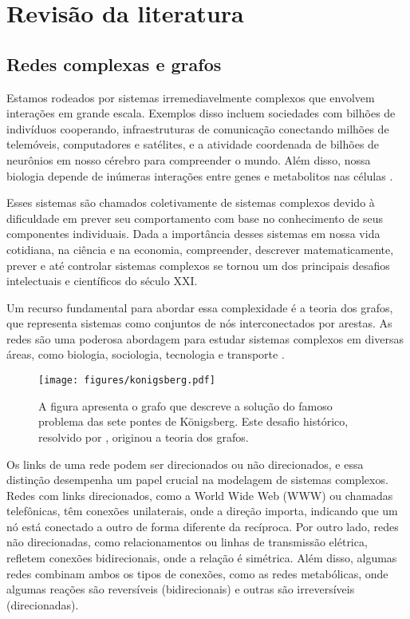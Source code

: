 \chapter{Revisão da literatura}

\section{Redes complexas e grafos}

Estamos rodeados por sistemas irremediavelmente complexos que envolvem interações em grande escala. Exemplos disso incluem sociedades com bilhões de indivíduos cooperando, infraestruturas de comunicação conectando milhões de telemóveis, computadores e satélites, e a atividade coordenada de bilhões de neurônios em nosso cérebro para compreender o mundo. Além disso, nossa biologia depende de inúmeras interações entre genes e metabolitos nas células \cite{Albert_2002}.

Esses sistemas são chamados coletivamente de sistemas complexos devido à dificuldade em prever seu comportamento com base no conhecimento de seus componentes individuais. Dada a importância desses sistemas em nossa vida cotidiana, na ciência e na economia, compreender, descrever matematicamente, prever e até controlar sistemas complexos se tornou um dos principais desafios intelectuais e científicos do século XXI.

Um recurso fundamental para abordar essa complexidade é a teoria dos grafos, que representa sistemas como conjuntos de nós interconectados por arestas. As redes são uma poderosa abordagem para estudar sistemas complexos em diversas áreas, como biologia, sociologia, tecnologia e transporte \cite{barabasi2016network}.

\begin{figure}[!h]
    \centering
    \texttt{[image: figures/konigsberg.pdf]}
    \caption{A figura apresenta o grafo que descreve a solução do famoso problema das sete pontes de Königsberg. Este desafio histórico, resolvido por , originou a teoria dos grafos.}
    \label{fig:basin-region}
\end{figure}

Os links de uma rede podem ser direcionados ou não direcionados, e essa distinção desempenha um papel crucial na modelagem de sistemas complexos. Redes com links direcionados, como a World Wide Web (WWW) ou chamadas telefônicas, têm conexões unilaterais, onde a direção importa, indicando que um nó está conectado a outro de forma diferente da recíproca. Por outro lado, redes não direcionadas, como relacionamentos ou linhas de transmissão elétrica, refletem conexões bidirecionais, onde a relação é simétrica. Além disso, algumas redes combinam ambos os tipos de conexões, como as redes metabólicas, onde algumas reações são reversíveis (bidirecionais) e outras são irreversíveis (direcionadas).

